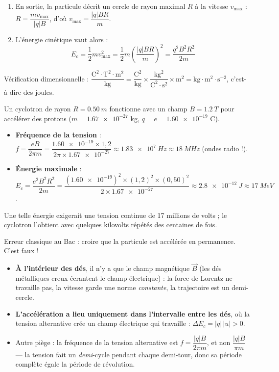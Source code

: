 \documentclass[11pt]{article}
\begin{document}
\begin{experience}[Démonstration guidée de $E_c = \dfrac{q^2B^2R^2}{2m}$]
\begin{enumerate}
\item En sortie, la particule décrit un cercle de rayon maximal $R$ à la vitesse $v_{\max}$ : $R = \dfrac{mv_{\max}}{|q|B}$, d'où $v_{\max} = \dfrac{|q|BR}{m}$.
\item L'énergie cinétique vaut alors :
\[ E_c = \frac{1}{2}mv_{\max}^2 = \frac{1}{2}m\left(\frac{|q|BR}{m}\right)^2 = \frac{q^2B^2R^2}{2m} \]
\end{enumerate}
Vérification dimensionnelle : $\dfrac{\text{C}^2\cdot\text{T}^2\cdot\text{m}^2}{\text{kg}} = \dfrac{\text{C}^2}{\text{kg}}\times\dfrac{\text{kg}^2}{\text{C}^2\cdot\text{s}^2}\times\text{m}^2 = \text{kg}\cdot\text{m}^2\cdot\text{s}^{-2}$, c'est-à-dire des joules.
\end{experience}

\begin{exemplebox}
Un cyclotron de rayon $R = \SI{0,50}{m}$ fonctionne avec un champ $B = \SI{1,2}{T}$ pour accélérer des protons ($m = \num{1,67e-27}$ kg, $q = e = \num{1,60e-19}$ C).
\begin{itemize}
\item \textbf{Fréquence de la tension} : $f = \dfrac{eB}{2\pi m} = \dfrac{\num{1,60e-19}\times 1{,}2}{2\pi\times \num{1,67e-27}} \approx \SI{1,83e7}{Hz} \approx \SI{18}{MHz}$ (ondes radio !).
\item \textbf{Énergie maximale} : $E_c = \dfrac{e^2B^2R^2}{2m} = \dfrac{(\num{1,60e-19})^2\times(1{,}2)^2\times(0{,}50)^2}{2\times \num{1,67e-27}} \approx \SI{2,8e-12}{J} \approx \SI{17}{MeV}$.
\end{itemize}
Une telle énergie exigerait une tension continue de 17 millions de volts ; le cyclotron l'obtient avec quelques kilovolts répétés des centaines de fois.
\end{exemplebox}

\begin{attention}
Erreur classique au Bac : croire que la particule est accélérée en permanence. C'est faux !
\begin{itemize}
\item \textbf{À l'intérieur des dés}, il n'y a que le champ magnétique $\vec{B}$ (les dés métalliques creux écrantent le champ électrique) : la force de Lorentz ne travaille pas, la vitesse garde une norme \emph{constante}, la trajectoire est un demi-cercle.
\item \textbf{L'accélération a lieu uniquement dans l'intervalle entre les dés}, où la tension alternative crée un champ électrique qui travaille : $\Delta E_c = |q|\,|u| > 0$.
\item Autre piège : la fréquence de la tension alternative est $f = \dfrac{|q|B}{2\pi m}$, et non $\dfrac{|q|B}{\pi m}$ — la tension fait un \emph{demi}-cycle pendant chaque demi-tour, donc sa période complète égale la période de révolution.
\end{itemize}
\end{attention}
\end{document}
